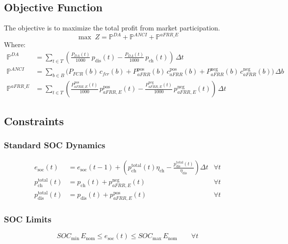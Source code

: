 \documentclass[11pt, a4paper]{article}
\begin{document}
\subsection{Objective Function}
The objective is to maximize the total profit from market participation.
\begin{equation}
\max \; Z = \mathbb{P}^{DA} + \mathbb{P}^{ANCI} + \mathbb{P}^{aFRR\_E}
\end{equation}
Where:
\begin{align}
\mathbb{P}^{DA} &= \sum_{t\in T} \left( \frac{P_{DA}(t)}{1000}\, p_{\mathrm{dis}}(t) - \frac{P_{DA}(t)}{1000}\, p_{\mathrm{ch}}(t) \right)\, \Delta t \\
\mathbb{P}^{ANCI} &= \sum_{b\in B} \Big( P_{FCR}(b)\, c_{fcr}(b) + P^{\mathrm{pos}}_{aFRR}(b)\, c^{\mathrm{pos}}_{aFRR}(b) + P^{\mathrm{neg}}_{aFRR}(b)\, c^{\mathrm{neg}}_{aFRR}(b) \Big)\, \Delta b \\
\mathbb{P}^{aFRR\_E} &= \sum_{t\in T} \left( \frac{P^{\mathrm{pos}}_{aFRR, E}(t)}{1000}\, p^{\mathrm{pos}}_{aFRR, E}(t) - \frac{P^{\mathrm{neg}}_{aFRR, E}(t)}{1000}\, p^{\mathrm{neg}}_{aFRR, E}(t) \right)\, \Delta t
\end{align}

\subsection{Constraints}

\subsubsection{Standard SOC Dynamics}
\begin{align}
e_{\mathrm{soc}}(t) &= e_{\mathrm{soc}}(t-1) + \left( p^{\mathrm{total}}_{\mathrm{ch}}(t) \eta_{\mathrm{ch}} - \frac{p^{\mathrm{total}}_{\mathrm{dis}}(t)}{\eta_{\mathrm{dis}}} \right) \Delta t & \forall t \\
p^{\mathrm{total}}_{\mathrm{ch}}(t) &= p_{\mathrm{ch}}(t) + p^{\mathrm{neg}}_{aFRR,E}(t) & \forall t \\
p^{\mathrm{total}}_{\mathrm{dis}}(t) &= p_{\mathrm{dis}}(t) + p^{\mathrm{pos}}_{aFRR,E}(t) & \forall t
\end{align}

\subsubsection{SOC Limits}
\begin{equation}
SOC_{\min}\,E_{\mathrm{nom}} \le e_{\mathrm{soc}}(t) \le SOC_{\max}\,E_{\mathrm{nom}} \qquad \forall t
\end{equation}
\end{document}
